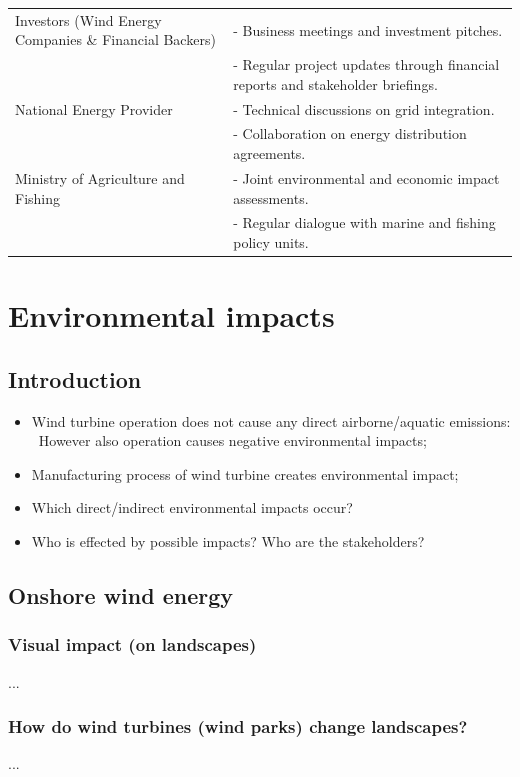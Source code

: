 \documentclass{article}
\newcommand{\tra}{\textrightarrow\ }
\begin{document}
\begin{longtable}{p{4cm} p{10cm}}
    Investors (Wind Energy Companies \& Financial Backers) &
    - Business meetings and investment pitches. \\
    & - Regular project updates through financial reports and stakeholder briefings. \\

    National Energy Provider &
    - Technical discussions on grid integration. \\
    & - Collaboration on energy distribution agreements. \\

    Ministry of Agriculture and Fishing &
    - Joint environmental and economic impact assessments. \\
    & - Regular dialogue with marine and fishing policy units. \\

\end{longtable}

\newpage
\section{Environmental impacts}
\subsection{Introduction}
\begin{itemize}
    \item Wind turbine operation does not cause any direct airborne/aquatic emissions:\\
        \tra However also operation causes negative environmental impacts;
    \item Manufacturing process of wind turbine creates environmental impact;
    \item Which direct/indirect environmental impacts occur?
    \item Who is effected by possible impacts? Who are the stakeholders?
\end{itemize}

\subsection{Onshore wind energy}
\subsubsection{Visual impact (on landscapes)}
...

\subsubsection{How do wind turbines (wind parks) change landscapes?}
...
\end{document}
